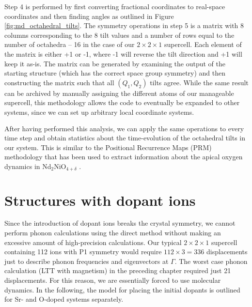 \noindent Step 4 is performed by first converting fractional coordinates to real-space coordinates and then finding angles as outlined in Figure \ref{fig:md_octahedral_tilts}. The symmetry operations in step 5 is a matrix with 8 columns corresponding to the 8 tilt values and a number of rows equal to the number of octahedra -- 16 in the case of our $2 \times 2 \times 1$ supercell. Each element of the matrix is either +1 or -1, where -1 will reverse the tilt direction and +1 will keep it as-is. The matrix can be generated by examining the output of the starting structure (which has the correct space group symmetry) and then constructing the matrix such that all $(Q_1, Q_2)$ tilts agree. While the same result can be archived by manually assigning the different atoms of our manageable supercell, this methodology allows the code to eventually be expanded to other systems, since we can set up arbitrary local coordinate systems.

After having performed this analysis, we can apply the same operations to every time step and obtain statistics about the time-evolution of the octahedral tilts in our system. This is similar to the Positional Recurrence Maps (PRM) methodology \cite{Piovano2016} that has been used to extract information about the apical oxygen dynamics in Nd$_2$NiO$_{4+\delta}$ \cite{Perrichon2015}.

\section{Structures with dopant ions}
Since the introduction of dopant ions breaks the crystal symmetry, we cannot perform phonon calculations using the direct method without making an excessive amount of high-precision calculations. Our typical $2 \times 2 \times 1$ supercell containing 112 ions with P1 symmetry would require $112 \times 3 = 336$ displacements just to describe phonon frequencies and eigenvectors at $\Gamma$. The worst case phonon calculation (LTT with magnetism) in the preceding chapter required just 21 displacements. For this reason, we are essentially forced to use molecular dynamics. In the following, the model for placing the initial dopants is outlined for Sr- and O-doped systems separately.

